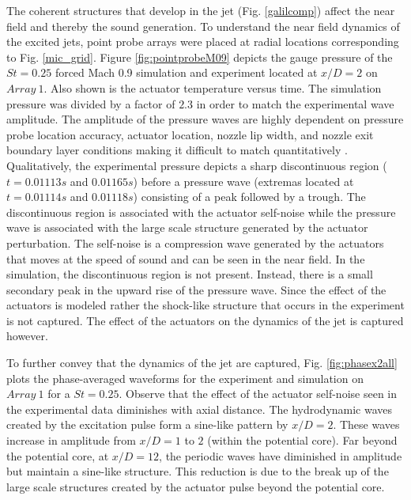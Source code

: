 \documentclass[english]{aiaa-tc}
\begin{document}
The coherent structures that develop in the jet (Fig. \ref{galilcomp}) affect the near field and thereby the sound generation. 
To understand the near field dynamics of the excited jets, point probe arrays were placed at radial locations corresponding to Fig. \ref{mic_grid}. 
Figure \ref{fig:pointprobeM09} depicts the gauge pressure of the $St=0.25$ forced Mach 0.9 simulation and experiment located at $x/D=2$ on $Array~1$. Also shown is the actuator temperature versus time. The simulation pressure was divided by a factor of $2.3$ in order to match the experimental wave amplitude. The amplitude of the pressure waves are highly dependent on pressure probe location accuracy, actuator location, nozzle lip width, and nozzle exit boundary layer conditions making it difficult to match quantitatively \cite{sinha2013}. Qualitatively, the experimental pressure depicts a sharp discontinuous region ($t=0.01113s$ and $0.01165s$)  before a pressure wave (extremas located at $t=0.01114s$ and $0.01118s$) consisting of a peak followed by a trough. The discontinuous region is associated with the actuator self-noise while the pressure wave is associated with the large scale structure generated by the actuator perturbation. The self-noise is a compression wave generated by the actuators that moves at the speed of sound and can be seen in the near field. In the simulation, the discontinuous region is not present. Instead, there is a small secondary peak in the upward rise of the pressure wave. Since the effect of the actuators is modeled rather the shock-like structure that occurs in the experiment is not captured. The effect of the actuators on the dynamics of the jet is captured however. 

To further convey that the dynamics of the jet are captured, Fig. \ref{fig:phasex2all} plots the phase-averaged waveforms for the experiment and simulation on $Array~1$ for a $St=0.25$. Observe that the effect of the actuator self-noise seen in the experimental data diminishes with axial distance. The hydrodynamic waves created by the excitation pulse form a sine-like pattern by $x/D=2$. These waves increase in amplitude from $x/D=1$ to $2$ (within the potential core). Far beyond the potential core, at $x/D=12$, the periodic waves have diminished in amplitude but maintain a sine-like structure. This reduction is due to the break up of the large scale structures created by the actuator pulse beyond the potential core. 
\end{document}
